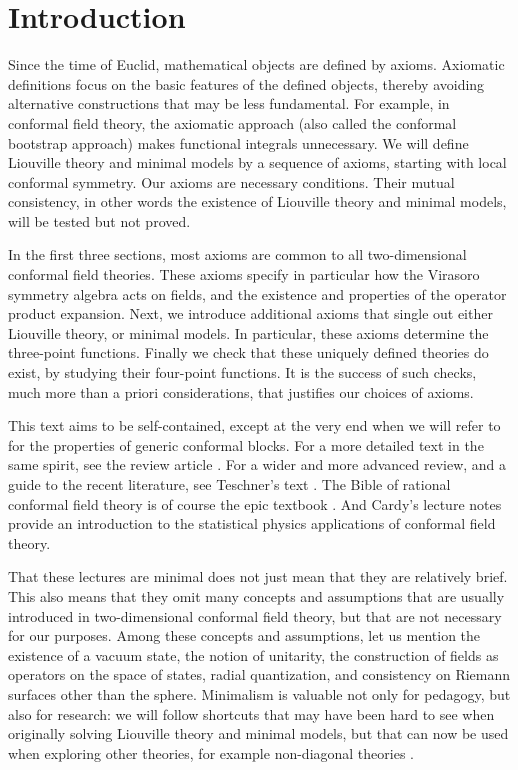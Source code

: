 \documentclass[12pt, a4paper]{article}
\theoremstyle{break}
\begin{document}
\clearpage

\tableofcontents

\hypersetup{linkcolor=blue}

\setcounter{section}{-1}

\section{Introduction}

Since the time of Euclid, mathematical objects are defined by axioms. 
Axiomatic definitions focus on the basic features of the defined objects, thereby avoiding alternative constructions that may be less fundamental.
For example, in conformal field theory, the axiomatic approach (also called the conformal bootstrap approach) makes functional integrals unnecessary.
We will define Liouville theory and minimal models by a sequence of axioms, starting with local conformal symmetry. 
Our axioms are necessary conditions. 
Their mutual consistency, in other words the existence of Liouville theory and minimal models, will be tested but not proved.

In the first three sections, most axioms are common to all two-dimensional conformal field theories.
These axioms specify in particular how the Virasoro symmetry algebra acts on fields, and the existence and properties of the operator product expansion. 
Next, we introduce additional axioms that single out either Liouville theory, or minimal models.
In particular, these axioms determine the three-point functions. 
Finally we check that these uniquely defined theories do exist, by studying their four-point functions.
It is the success of such checks, much more than a priori considerations, that justifies our choices of axioms. 

This text  aims to be self-contained, except at the very end when we will refer to \cite{zz90} for the properties of generic conformal blocks.
For a more detailed text in the same spirit, see the review article \cite{rib14}. For a wider and more advanced review, and a guide to the recent literature, see Teschner's text \cite{tes17}. 
The Bible of rational conformal field theory is of course the epic textbook \cite{fms97}. And Cardy's lecture notes \cite{car08} provide an introduction to the statistical physics applications of conformal field theory.

That these lectures are minimal does not just mean that they are relatively brief. This also means that they omit many concepts and assumptions that are usually introduced in two-dimensional conformal field theory, but that are not necessary for our purposes. Among these concepts and assumptions, let us mention the existence of a vacuum state, the notion of unitarity, the construction of fields as operators on the space of states, radial quantization, and consistency on Riemann surfaces other than the sphere. Minimalism is valuable not only for pedagogy, but also for research: we will follow shortcuts that may have been hard to see when originally solving Liouville theory and minimal models, but that can now be used when exploring other theories, for example non-diagonal theories \cite{mr17}. 
\end{document}
